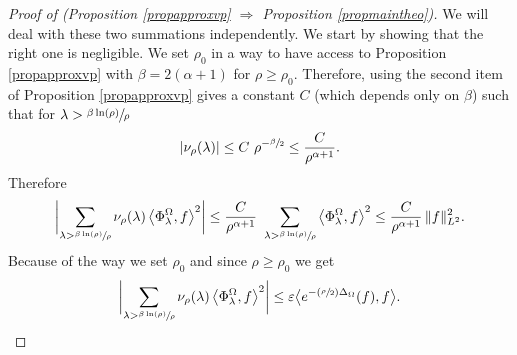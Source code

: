 \documentclass[10pt]{amsart}
\let\epsilon\varepsilon
\newcommand{\Psfrac}[2]{(\sfrac{#1}{#2})}
\theoremstyle{plain}
\theoremstyle{definition}
\newcommand{\somme}[1]{\sum_{#1}}
\begin{document}
\begin{proof}[Proof of (Proposition \ref{propapproxvp}
$\Rightarrow$ Proposition \ref{propmaintheo})]
We will deal with these two summations independently. We start by showing that the right one is negligible. We set $\rho_0$ in a way to have access to Proposition \ref{propapproxvp} with $\beta = 2 (\alpha +1)$ for $\rho \ge \rho_0$. Therefore, using the second item of Proposition \ref{propapproxvp} gives a constant $C$ (which depends only on $\beta$) such that for $\lambda > \sfrac{\beta \ln(\rho)}{\rho}$
\begin{align*}
| \nu_{\rho} (\lambda) | \le C \ \rho^{-\sfrac{\beta}{2}} \le \frac{C}{\rho^{\alpha +1}}.
\end{align*}
Therefore
\[
\biggl| \somme{ \lambda > \sfrac{\beta \ln (\rho)} {\rho}} \nu_{\rho}(\lambda) \left<\Phi^{\Omega}_{\lambda},f \right>^2 \biggr| \le \frac{ C}{\rho^{\alpha+1}} \ \somme{ \lambda > \sfrac{\beta \ln (\rho)} {\rho}} \left<\Phi^{\Omega}_{\lambda},f \right>^2 \le \frac{C}{\rho^{\alpha+1}} \,\|f\|_{L^2}^2.
\]
Because of the way we set $\rho_0$ and since $\rho \ge \rho_0$ we get
\begin{equation}
\label{eq20}
\biggl| \somme{ \lambda > \sfrac{\beta \ln (\rho)} {\rho}} \nu_{\rho}(\lambda) \left<\Phi^{\Omega}_{\lambda},f \right>^2 \biggr| \le \epsilon \bigl< e^{- \Psfrac{\rho}{2} \Delta_{\Omega}}(f), f \bigr>.
\end{equation}


\end{proof}
\end{document}
